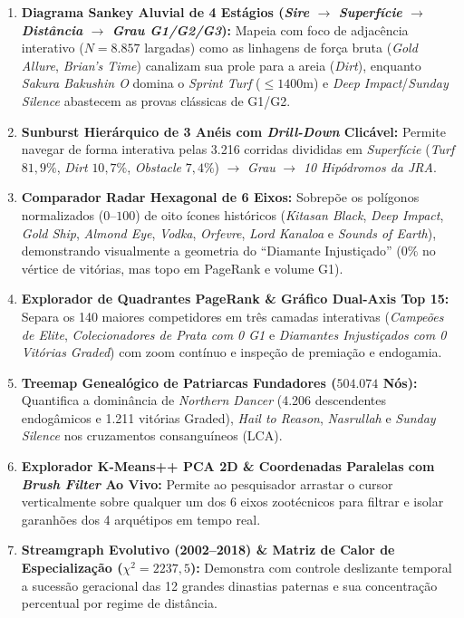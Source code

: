 \documentclass[12pt,a4paper]{article}
\begin{document}
\begin{enumerate}
    \item \textbf{Diagrama Sankey Aluvial de 4 Estágios (\textit{Sire} $\to$ \textit{Superfície} $\to$ \textit{Distância} $\to$ \textit{Grau G1/G2/G3}):} Mapeia com foco de adjacência interativo ($N = 8.857$ largadas) como as linhagens de força bruta (\textit{Gold Allure}, \textit{Brian's Time}) canalizam sua prole para a areia (\textit{Dirt}), enquanto \textit{Sakura Bakushin O} domina o \textit{Sprint Turf} ($\le 1400\text{m}$) e \textit{Deep Impact}/\textit{Sunday Silence} abastecem as provas clássicas de G1/G2.
    \item \textbf{Sunburst Hierárquico de 3 Anéis com \textit{Drill-Down} Clicável:} Permite navegar de forma interativa pelas 3.216 corridas divididas em \textit{Superfície} (\textit{Turf} $81,9\%$, \textit{Dirt} $10,7\%$, \textit{Obstacle} $7,4\%$) $\to$ \textit{Grau} $\to$ \textit{10 Hipódromos da JRA}.
    \item \textbf{Comparador Radar Hexagonal de 6 Eixos:} Sobrepõe os polígonos normalizados ($0\text{--}100$) de oito ícones históricos (\textit{Kitasan Black}, \textit{Deep Impact}, \textit{Gold Ship}, \textit{Almond Eye}, \textit{Vodka}, \textit{Orfevre}, \textit{Lord Kanaloa} e \textit{Sounds of Earth}), demonstrando visualmente a geometria do ``Diamante Injustiçado'' ($0\%$ no vértice de vitórias, mas topo em PageRank e volume G1).
    \item \textbf{Explorador de Quadrantes PageRank \& Gráfico Dual-Axis Top 15:} Separa os 140 maiores competidores em três camadas interativas (\textit{Campeões de Elite}, \textit{Colecionadores de Prata com 0 G1} e \textit{Diamantes Injustiçados com 0 Vitórias Graded}) com zoom contínuo e inspeção de premiação e endogamia.
    \item \textbf{Treemap Genealógico de Patriarcas Fundadores ($504.074$ Nós):} Quantifica a dominância de \textit{Northern Dancer} (4.206 descendentes endogâmicos e 1.211 vitórias Graded), \textit{Hail to Reason}, \textit{Nasrullah} e \textit{Sunday Silence} nos cruzamentos consanguíneos (LCA).
    \item \textbf{Explorador K-Means++ PCA 2D \& Coordenadas Paralelas com \textit{Brush Filter} Ao Vivo:} Permite ao pesquisador arrastar o cursor verticalmente sobre qualquer um dos 6 eixos zootécnicos para filtrar e isolar garanhões dos 4 arquétipos em tempo real.
    \item \textbf{Streamgraph Evolutivo (2002--2018) \& Matriz de Calor de Especialização ($\chi^2 = 2237,5$):} Demonstra com controle deslizante temporal a sucessão geracional das 12 grandes dinastias paternas e sua concentração percentual por regime de distância.

\end{enumerate}
\end{document}
